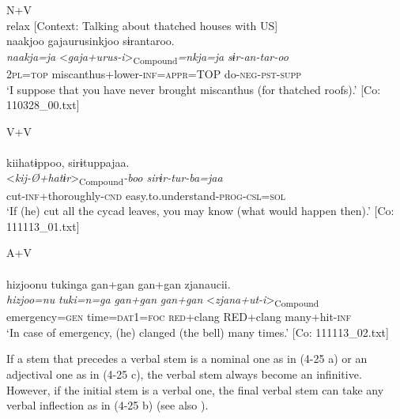 \ea \label{ex:4.25} \ea  N+V \label{ex:4.25a}\\relax
    [Context: Talking about thatched houses with US]\\
\glll   naakjoo  gajaurusinkjoo  sɨrantaroo.\\
      \textit{naakja=ja}  <\textit{gaja+urus-i}>\textsubscript{Compound}\textit{=nkja=ja}  \textit{sɨr-an-tar-oo}\\
      2\textsc{pl}=\textsc{top}  miscanthus+lower-\textsc{inf}=\textsc{appr}=TOP  do-\textsc{neg}-\textsc{pst}-\textsc{supp}\\
      \glt       ‘I suppose that you have never brought miscanthus (for thatched roofs).’ [Co: 110328\_00.txt]

\ex  V+V\\\\
\glll     kiihatɨppoo,  sirɨtuppajaa.\\
      <\textit{kij-Ø+hatɨr}>\textsubscript{Compound}\textit{{}-boo  sirɨr-tur-ba=jaa}\\
      cut-\textsc{inf}+thoroughly-\textsc{cnd}  easy.to.understand-\textsc{prog}-\textsc{csl}=\textsc{sol}\\
    \glt       ‘If (he) cut all the cycad leaves, you may know (what would happen then).’ [Co: 111113\_01.txt]

\ex A+V\\\\
\glll    {\textbar}hizjoo{\textbar}nu  tukinga  gan+gan  gan+gan    zjanaucii.\\
      \textit{hizjoo=nu}  \textit{tuki=n=ga}  \textit{gan+gan}  \textit{gan+gan}   <\textit{zjana+ut-i}>\textsubscript{Compound}\\
      emergency=\textsc{gen}  time=\textsc{dat}1=\textsc{foc}  \textsc{red}+clang  RED+clang     many+hit-\textsc{inf}    \\
    \glt       ‘In case of emergency, (he) clanged (the bell) many times.’ [Co: 111113\_02.txt]
    \z
\z

If a stem that precedes a verbal stem is a nominal one as in (4-25 a) or an adjectival one as in (4-25 c), the verbal stem always become an infinitive. However, if the initial stem is a verbal one, the final verbal stem can take any verbal inflection as in (4-25 b) (see also ).

